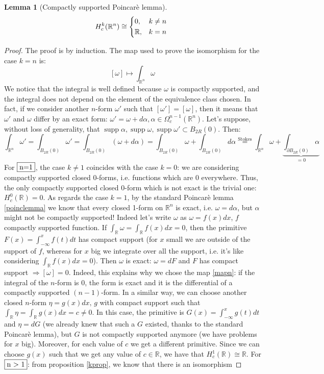 \documentclass[a4paper,11pt,titlepage, article, oneside]{memoir}
\numberwithin{equation}{section}
\newtheorem{lemma}[theorem]{Lemma}
\theoremstyle{definition}
\theoremstyle{remark}
\DeclareMathOperator{\supp}{supp}
\newcommand{\rfield}{\mathbb{R}}
\begin{document}
\begin{lemma}[Compactly supported Poincarè lemma] \label{compsupppoinclemma}
\begin{equation}
H_c^k(\rfield^n) \cong 
\begin{cases*}
0, & $k \not = n$ \\
\rfield, & $k = n$
\end{cases*}
\end{equation}
\end{lemma}
\begin{proof}
The proof is by induction. The map used to prove the isomorphism for the case $k = n$ is:
\begin{equation} \label{mapn}
[\omega] \mapsto \int_{\rfield^n} \omega
\end{equation}
We notice that the integral is well defined because $\omega$ is compactly supported, and the integral does not depend on the element of the equivalence class chosen. In fact, if we consider another $n$-form $\omega'$ such that $[\omega'] = [\omega]$, then it means that $\omega'$ and $\omega$ differ by an exact form: $\omega' = \omega + d \alpha, \alpha \in \Omega_c^{n-1}(\rfield^n)$. Let's suppose, without loss of generality, that $\supp \alpha, \supp \omega, \supp \omega' \subset B_{2R}(0)$. Then:
$$\int_{\rfield^n} \omega' = \int_{B_{2R}(0)} \omega' = \int_{B_{2R}(0)}(\omega + d \alpha) = \int_{B_{2R}(0)}\omega + \int_{B_{2R}(0)} d \alpha \overset{\text{Stokes}} = \int_{\rfield^n} \omega + \underbrace{\int_{\partial B_{2R}(0)} \alpha}_{=0}$$
For $\fbox{n=1}$, the case $k \not = 1$ coincides with the case $k=0$: we are considering compactly supported closed 0-forms, i.e. functions which are 0 everywhere. Thus, the only compactly supported closed 0-form which is not exact is the trivial one:  $H^0_c(\rfield) = 0$. As regards the case $k=1$, by the standard Poincarè lemma \eqref{poinclemma} we know that every closed 1-form on $\rfield^n$ is exact, i.e. $\omega = d\alpha$, but $\alpha$ might not be compactly supported! Indeed let's write $\omega$ as $\omega=f(x) dx$, $f$ compactly supported function. If $\int_{\rfield} \omega = \int_{\rfield} f(x)dx = 0$, then the primitive $F(x)=\int_{-\infty}^x f(t)dt$ has compact support (for $x$ small we are outside of the support of $f$, whereas for $x$ big we integrate over all the support, i.e. it's like considering $\int_{\rfield} f(x) dx = 0$). Then $\omega$ is exact: $\omega = dF$ and $F$ has compact support $\Rightarrow [\omega]=0$. Indeed, this explains why we chose the map \eqref{mapn}: if the integral of the $n$-form is 0, the form is exact and it is the differential of a compactly supported $(n-1)$-form. In a similar way, we can choose another closed $n$-form $\eta=g(x)dx,\, g$ with compact support such that $\int_{\rfield}\eta = \int_{\rfield} g(x)dx=c \not=0$. In this case, the primitive is $G(x) = \int_{-\infty}^x g(t)dt$ and $\eta = dG$ (we already knew that such a $G$ existed, thanks to the standard Poincarè lemma), but $G$ is not compactly supported anymore (we have problems for $x$ big). Moreover, for each value of $c$ we get a different primitive. Since we can choose $g(x)$ such that we get any value of $c \in \rfield$, we have that $H_c^1(\rfield) \cong \rfield$. For $\fbox{n > 1}$: from proposition \ref{kprop}, we know that there is an isomorphism 

\end{proof}
\end{document}
